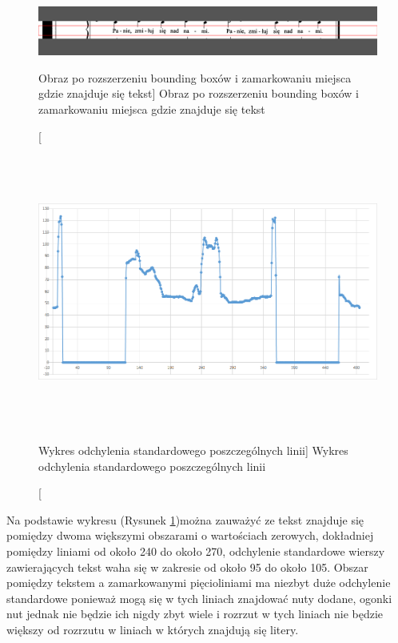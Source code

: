 \documentclass[a4paper,12pt]{article}
\begin{document}
		        \begin{figure}[!ht]  
			        \begin{center}
				        \includegraphics[width=16.5cm, frame] {image//exampleImage//005_b.png} 
			        \end{center}
			        \caption
    			        [Obraz po rozszerzeniu bounding boxów i zamarkowaniu miejsca gdzie znajduje się tekst]  
    			        {Obraz po rozszerzeniu bounding boxów i zamarkowaniu miejsca gdzie znajduje się tekst}
		        \end{figure} 
		    \newpage
		        \begin{figure}[!ht]  
			        \begin{center}
				        \includegraphics[height=9cm, frame] {image//practicalPart//stdDevDetectText.png} 
			        \end{center}
			        \caption
        			    [Wykres odchylenia standardowego poszczególnych linii]  
        			    {Wykres odchylenia standardowego poszczególnych linii}  
        			    \label{fig:stdDevLineTex}
		        \end{figure}
		    
		    Na podstawie wykresu (Rysunek \ref{fig:stdDevLineTex})można zauważyć ze tekst znajduje się pomiędzy dwoma większymi obszarami o wartościach zerowych, dokładniej pomiędzy liniami od około 240 do około 270, odchylenie standardowe wierszy zawierających tekst waha się w zakresie od około 95 do około 105. Obszar pomiędzy tekstem a zamarkowanymi pięcioliniami ma niezbyt duże odchylenie standardowe ponieważ mogą się w tych liniach znajdować nuty dodane, ogonki nut jednak nie będzie ich nigdy zbyt wiele i rozrzut w tych liniach nie będzie większy od rozrzutu w liniach w których znajdują się litery.
\end{document}
